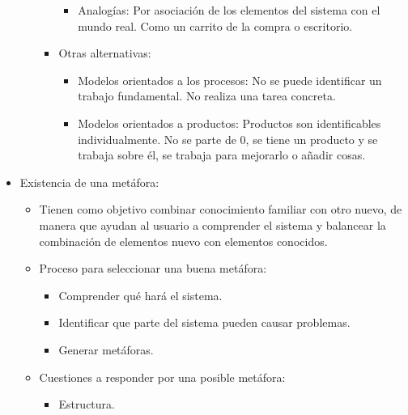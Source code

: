 \documentclass[12pt, twoside, openright]{report} %
\begin{document}
\begin{itemize}
\begin{itemize}
\begin{itemize}
			                  \begin{itemize}
				                  \item Analogías: Por asociación de los elementos del sistema con
				                        el mundo real. Como un carrito de la compra o escritorio.
			                  \end{itemize}

			            \item Otras alternativas:

			                  \begin{itemize}
				                  \item Modelos orientados a los procesos: No se puede identificar
				                        un trabajo fundamental. No realiza una tarea concreta.

				                  \item Modelos orientados a productos: Productos son identificables
				                        individualmente. No se parte de 0, se tiene un producto y se
				                        trabaja sobre él, se trabaja para mejorarlo o añadir cosas.
			                  \end{itemize}
		            \end{itemize}
	      \end{itemize}
	\pagebreak
	\item Existencia de una metáfora:
	      \begin{itemize}
		      \item Tienen como objetivo combinar conocimiento familiar con otro
		            nuevo, de manera que ayudan al usuario a comprender el sistema y
		            balancear la combinación de elementos nuevo con elementos
		            conocidos.
		      \item Proceso para seleccionar una buena metáfora:
		            \begin{itemize}
			            \item Comprender qué hará el sistema.

			            \item Identificar que parte del sistema pueden causar problemas.

			            \item Generar metáforas.
		            \end{itemize}
		      \item Cuestiones a responder por una posible metáfora:
		            \begin{itemize}
			            \item Estructura.


\end{itemize}
\end{itemize}
\end{itemize}
\end{document}
